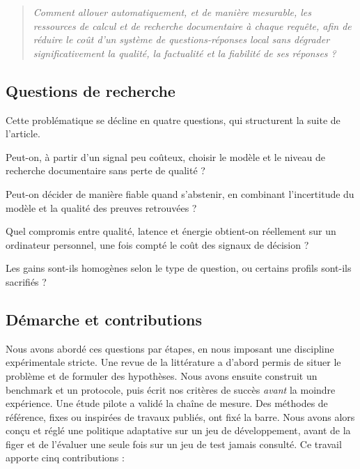 \documentclass[11pt,a4paper]{article}
\begin{document}
\begin{quote}
\emph{Comment allouer automatiquement, et de manière mesurable, les ressources de calcul et de recherche
documentaire à chaque requête, afin de réduire le coût d'un système de questions-réponses local sans
dégrader significativement la qualité, la factualité et la fiabilité de ses réponses ?}
\end{quote}

\subsection{Questions de recherche}

Cette problématique se décline en quatre questions, qui structurent la suite de l'article.

\begin{description}[style=sameline,leftmargin=1.2cm]
\item[QR1] Peut-on, à partir d'un signal peu coûteux, choisir le modèle et le niveau de recherche
documentaire sans perte de qualité ?
\item[QR2] Peut-on décider de manière fiable quand s'abstenir, en combinant l'incertitude du modèle et
la qualité des preuves retrouvées ?
\item[QR3] Quel compromis entre qualité, latence et énergie obtient-on réellement sur un ordinateur
personnel, une fois compté le coût des signaux de décision ?
\item[QR4] Les gains sont-ils homogènes selon le type de question, ou certains profils sont-ils
sacrifiés ?
\end{description}

\subsection{Démarche et contributions}

Nous avons abordé ces questions par étapes, en nous imposant une discipline expérimentale stricte. Une
revue de la littérature a d'abord permis de situer le problème et de formuler des hypothèses. Nous avons
ensuite construit un benchmark et un protocole, puis écrit nos critères de succès \emph{avant} la
moindre expérience. Une étude pilote a validé la chaîne de mesure. Des méthodes de référence, fixes ou
inspirées de travaux publiés, ont fixé la barre. Nous avons alors conçu et réglé une politique
adaptative sur un jeu de développement, avant de la figer et de l'évaluer une seule fois sur un jeu de
test jamais consulté. Ce travail apporte cinq contributions :
\end{document}
